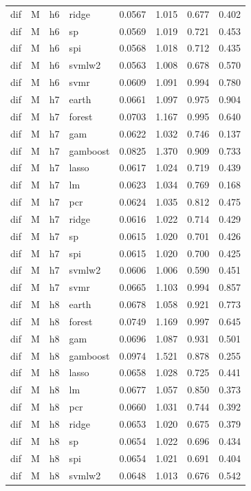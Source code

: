 \begin{ThreePartTable}
\begin{longtable}[t]{llclcccc}
dif & M & h6 & ridge & 0.0567 & 1.015 & 0.677 & 0.402\\
dif & M & h6 & sp & 0.0569 & 1.019 & 0.721 & 0.453\\
dif & M & h6 & spi & 0.0568 & 1.018 & 0.712 & 0.435\\
dif & M & h6 & svmlw2 & 0.0563 & 1.008 & 0.678 & 0.570\\
dif & M & h6 & svmr & 0.0609 & 1.091 & 0.994 & 0.780\\
\addlinespace
dif & M & h7 & earth & 0.0661 & 1.097 & 0.975 & 0.904\\
dif & M & h7 & forest & 0.0703 & 1.167 & 0.995 & 0.640\\
dif & M & h7 & gam & 0.0622 & 1.032 & 0.746 & 0.137\\
dif & M & h7 & gamboost & 0.0825 & 1.370 & 0.909 & 0.733\\
dif & M & h7 & lasso & 0.0617 & 1.024 & 0.719 & 0.439\\
dif & M & h7 & lm & 0.0623 & 1.034 & 0.769 & 0.168\\
dif & M & h7 & pcr & 0.0624 & 1.035 & 0.812 & 0.475\\
dif & M & h7 & ridge & 0.0616 & 1.022 & 0.714 & 0.429\\
dif & M & h7 & sp & 0.0615 & 1.020 & 0.701 & 0.426\\
dif & M & h7 & spi & 0.0615 & 1.020 & 0.700 & 0.425\\
dif & M & h7 & svmlw2 & 0.0606 & 1.006 & 0.590 & 0.451\\
dif & M & h7 & svmr & 0.0665 & 1.103 & 0.994 & 0.857\\
\addlinespace
dif & M & h8 & earth & 0.0678 & 1.058 & 0.921 & 0.773\\
dif & M & h8 & forest & 0.0749 & 1.169 & 0.997 & 0.645\\
dif & M & h8 & gam & 0.0696 & 1.087 & 0.931 & 0.501\\
dif & M & h8 & gamboost & 0.0974 & 1.521 & 0.878 & 0.255\\
dif & M & h8 & lasso & 0.0658 & 1.028 & 0.725 & 0.441\\
dif & M & h8 & lm & 0.0677 & 1.057 & 0.850 & 0.373\\
dif & M & h8 & pcr & 0.0660 & 1.031 & 0.744 & 0.392\\
dif & M & h8 & ridge & 0.0653 & 1.020 & 0.675 & 0.379\\
dif & M & h8 & sp & 0.0654 & 1.022 & 0.696 & 0.434\\
dif & M & h8 & spi & 0.0654 & 1.021 & 0.691 & 0.404\\
dif & M & h8 & svmlw2 & 0.0648 & 1.013 & 0.676 & 0.542\\

\end{longtable}
\end{ThreePartTable}

